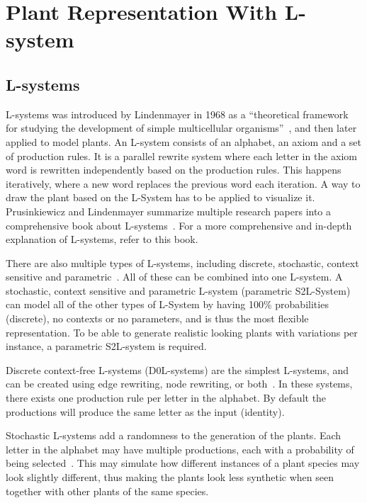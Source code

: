 \chapter{Plant Representation With L-system}

\section{L-systems}
L-systems was introduced by Lindenmayer in 1968 as a ``theoretical framework for studying the development of simple multicellular organisms''~\cite{2012Prusinkiewicz}, and then later applied to model plants.
An L-system consists of an alphabet, an axiom and a set of production rules.
It is a parallel rewrite system where each letter in the axiom word is rewritten independently based on the production rules.
This happens iteratively, where a new word replaces the previous word each iteration.
A way to draw the plant based on the L-System has to be applied to visualize it.
Prusinkiewicz and Lindenmayer summarize multiple research papers into a comprehensive book about L-systems~\cite{2012Prusinkiewicz}.
For a more comprehensive and in-depth explanation of L-systems, refer to this book.

There are also multiple types of L-systems, including discrete, stochastic, context sensitive and parametric~\cite{2012Prusinkiewicz}.
All of these can be combined into one L-system.
A stochastic, context sensitive and parametric L-system (parametric S2L-System) can model all of the other types of L-System by having 100\% probabilities (discrete), no contexts or no parameters, and is thus the most flexible representation.
To be able to generate realistic looking plants with variations per instance, a parametric S2L-system is required.

Discrete context-free L-systems (D0L-systems) are the simplest L-systems, and can be created using edge rewriting, node rewriting, or both~\cite{2012Prusinkiewicz}.
In these systems, there exists one production rule per letter in the alphabet.
By default the productions will produce the same letter as the input (identity).

Stochastic L-systems add a randomness to the generation of the plants.
Each letter in the alphabet may have multiple productions, each with a probability of being selected~\cite{2012Prusinkiewicz}.
This may simulate how different instances of a plant species may look slightly different, thus making the plants look less synthetic when seen together with other plants of the same species.

